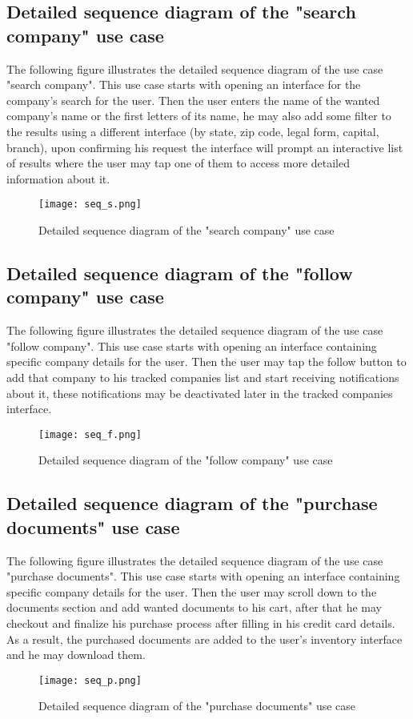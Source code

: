 \subsection{Detailed sequence diagram of the "search company" use case}
The following figure illustrates the detailed sequence diagram of the use case
"search company".
This use case starts with opening an interface for the company's search for the user. Then the user enters the name of the wanted company's name or the first letters of its name, he may also add some filter to the results using a different interface (by state, zip code, legal form, capital, branch), upon confirming his request the interface will prompt an interactive list of results where the user may tap one of them to access more detailed information about it.
 \begin{figure}[H]%
    \center   
    \texttt{[image: seq\_s.png]}
    \caption{Detailed sequence diagram of the "search company" use case}
\end{figure}

\subsection{Detailed sequence diagram of the "follow company" use case}
The following figure illustrates the detailed sequence diagram of the use case
"follow company".
This use case starts with opening an interface containing specific company details for the user. Then the user may tap the follow button to add that company to his tracked companies list and start receiving notifications about it, these notifications may be deactivated later in the tracked companies interface.
\begin{figure}[H]%
    \center   
    \texttt{[image: seq\_f.png]}
    \caption{Detailed sequence diagram of the "follow company" use case}
\end{figure}
\subsection{Detailed sequence diagram of the "purchase documents" use case}
The following figure illustrates the detailed sequence diagram of the use case
"purchase documents".
This use case starts with opening an interface containing specific company details for the user. Then the user may scroll down to the documents section and add wanted documents to his cart, after that he may checkout and finalize his purchase process after filling in his credit card details. As a result, the purchased documents are added to the user's inventory interface and he may download them.
\begin{figure}[H]%
    \center   
    \texttt{[image: seq\_p.png]}
    \caption{Detailed sequence diagram of the "purchase documents" use case}
\end{figure}
